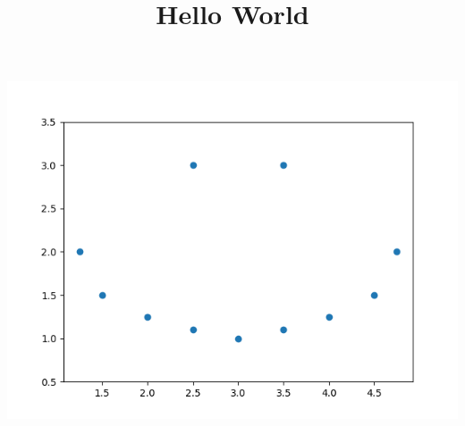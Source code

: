 \documentclass{article}
\begin{document}
\title{Hello World}
\maketitle
\includegraphics[scale=0.65]{plot-data.png}
\end{document}

